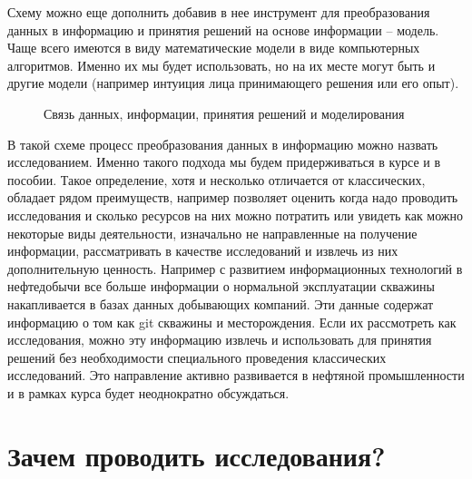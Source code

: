 Схему можно еще дополнить добавив в нее инструмент для преобразования данных в информацию и принятия решений на основе информации -- модель. Чаще всего имеются в виду математические модели в виде компьютерных алгоритмов. Именно их мы будет использовать, но на их месте могут быть и другие модели (например интуиция лица принимающего решения или его опыт). 

\begin{figure}[h!]
	\begin{center}
		
		\caption{Связь данных, информации, принятия решений и моделирования}
		\label{ris:data_model_chart_1}
	\end{center}
\end{figure}
В такой схеме процесс преобразования данных в информацию можно назвать исследованием.   
Именно такого подхода мы будем придерживаться в курсе и в пособии. Такое определение, хотя и несколько отличается от классических, обладает рядом преимуществ, например позволяет оценить когда надо проводить исследования и сколько ресурсов на них можно потратить или увидеть как можно некоторые виды деятельности, изначально не направленные на получение информации, рассматривать в качестве исследований и извлечь из них дополнительную ценность. Например с развитием информационных технологий в нефтедобычи все больше информации о нормальной эксплуатации скважины накапливается в базах данных добывающих компаний. Эти данные содержат информацию о том как git скважины и месторождения. Если их рассмотреть как исследования, можно эту информацию извлечь и использовать для принятия решений без необходимости специального проведения классических исследований. Это направление активно развивается в нефтяной промышленности и в рамках курса будет неоднократно обсуждаться.

\section{Зачем проводить исследования?}

